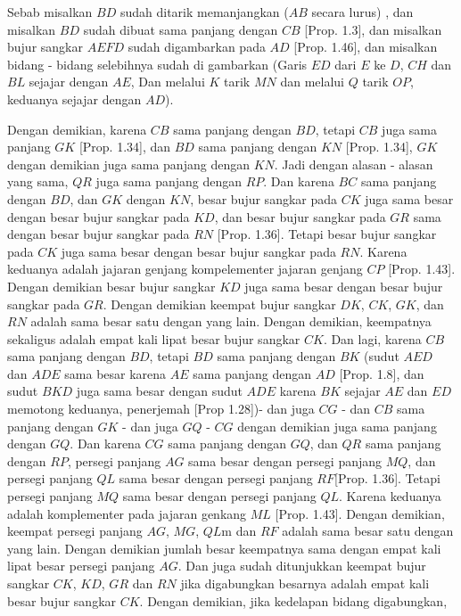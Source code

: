 \documentclass[a4paper]{book}
\begin{document}
Sebab misalkan $BD$ sudah ditarik memanjangkan ($AB$ secara lurus)
, dan misalkan $BD$ sudah dibuat sama panjang dengan $CB$ [Prop. 1.3], dan
misalkan bujur sangkar $AEFD$ sudah digambarkan pada $AD$ [Prop. 1.46], dan 
misalkan bidang - bidang selebihnya sudah di gambarkan (Garis $ED$ dari $E$ 
ke $D$, $CH$ dan $BL$ sejajar dengan $AE$, Dan melalui $K$ tarik $MN$ dan 
melalui $Q$ tarik $OP$, keduanya sejajar dengan $AD$).

Dengan demikian, karena $CB$ sama panjang dengan $BD$, tetapi $CB$ juga 
sama panjang $GK$ [Prop. 1.34], dan $BD$ sama panjang dengan $KN$ [Prop. 1.34],
$GK$ dengan demikian juga sama panjang dengan $KN$. Jadi dengan alasan - alasan 
yang sama, $QR$ juga sama panjang dengan $RP$. Dan karena $BC$ sama panjang 
dengan $BD$, dan $GK$ dengan $KN$, besar bujur sangkar pada $CK$ juga sama besar
dengan besar bujur sangkar pada $KD$, dan besar bujur sangkar pada $GR$ sama
dengan besar bujur sangkar pada $RN$ [Prop. 1.36]. Tetapi besar bujur sangkar
pada $CK$ juga sama besar dengan besar bujur sangkar pada $RN$. Karena keduanya
adalah jajaran genjang kompelementer jajaran genjang $CP$ [Prop. 1.43].
Dengan demikian besar bujur sangkar $KD$ juga sama besar dengan besar bujur 
sangkar pada $GR$. Dengan demikian keempat bujur sangkar $DK$, $CK$, $GK$, dan
$RN$ adalah sama besar satu dengan yang lain. Dengan demikian, keempatnya 
sekaligus adalah empat kali lipat besar bujur sangkar $CK$. Dan lagi, karena 
$CB$ sama panjang dengan $BD$, tetapi $BD$ sama panjang dengan $BK$ 
(sudut $AED$ dan 
$ADE$ sama besar karena $AE$ sama panjang dengan $AD$ [Prop. 1.8], dan sudut 
$BKD$ juga sama besar dengan sudut $ADE$ karena $BK$ sejajar $AE$ dan $ED$ 
memotong keduanya, penerjemah [Prop 1.28])- dan juga $CG$ - dan
$CB$ sama panjang dengan $GK$ - dan juga $GQ$ - $CG$ dengan demikian juga 
sama panjang dengan $GQ$. Dan karena $CG$ sama panjang dengan $GQ$, dan $QR$
sama panjang dengan $RP$, persegi panjang $AG$ sama besar dengan persegi panjang 
$MQ$, dan persegi panjang $QL$ sama besar dengan persegi panjang $RF$[Prop. 1.36]. 
Tetapi persegi panjang $MQ$ sama besar dengan persegi panjang $QL$. Karena 
keduanya adalah komplementer pada jajaran genkang $ML$ [Prop. 1.43]. Dengan 
demikian, keempat persegi panjang $AG$, $MG$, $QL$m dan $RF$ adalah sama besar
satu dengan yang lain. Dengan demikian jumlah besar keempatnya sama dengan empat 
kali lipat besar persegi panjang $AG$. Dan juga sudah ditunjukkan keempat
bujur sangkar $CK$, $KD$, $GR$ dan $RN$ jika digabungkan besarnya adalah empat
kali besar bujur sangkar $CK$. Dengan demikian, jika kedelapan bidang digabungkan, 
\end{document}
